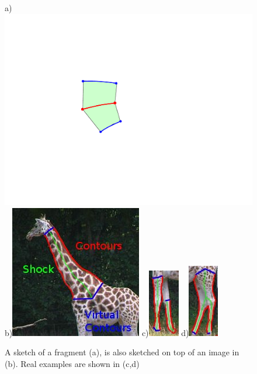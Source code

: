 \begin{figure}[h]
\centering
a) \includegraphics[width=0.2\linewidth]{figs/xshock-fragment-A12.pdf}
b)\includegraphics[width=0.25\linewidth]{figs/giraffe-fragment.jpg}
c)\includegraphics[height=0.25\linewidth]{figs/frontlegs.jpg}
d)\includegraphics[height=0.25\linewidth]{figs/back_legs.jpg}
\caption{ A sketch of a fragment (a), is also sketched on top of an image in (b). Real examples are shown in (c,d) }
  \label{fig:frag_sequence}
\end{figure}

